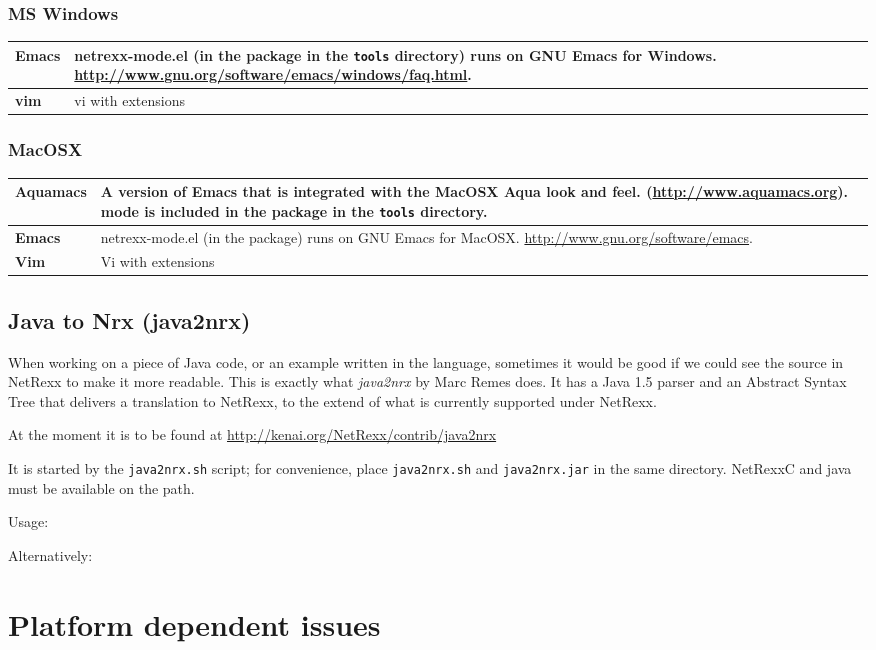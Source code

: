 {\subsection{MS Windows}
\begin{tabularx}{\textwidth}{>{\bfseries}lX}
\toprule
Emacs & netrexx-mode.el (in the \nr{} package in the \texttt{tools} directory) runs on GNU Emacs for
Windows. \url{http://www.gnu.org/software/emacs/windows/faq.html}.
\\\midrule
vim & vi with extensions
\\\bottomrule
\end{tabularx}
\subsection{MacOSX}
\begin{tabularx}{\textwidth}{>{\bfseries}lX}
\toprule
Aquamacs & A version of Emacs that is integrated with the MacOSX Aqua
look and feel. (\url{http://www.aquamacs.org}). \nr{} mode is
included in the \nr{} package in the \texttt{tools} directory.
\\\midrule
Emacs & netrexx-mode.el (in the \nr{} package) runs on GNU Emacs for
MacOSX. \url{http://www.gnu.org/software/emacs}.
\\\midrule
Vim & Vi with extensions
\\\bottomrule
\end{tabularx}
\section{Java to Nrx (java2nrx)}
When working on a piece of Java code, or an example written in the
language, sometimes it would be good if we could see the source in
NetRexx to make it more readable. This is exactly what \emph{java2nrx}
by Marc Remes does. It has a  Java 1.5 parser and an Abstract Syntax
Tree that delivers a translation to NetRexx, to the
extend of what is currently supported under NetRexx.

At the moment it is to be found at \url{http://kenai.org/NetRexx/contrib/java2nrx}

It is started by the \texttt{java2nrx.sh} script; for convenience, place \texttt{java2nrx.sh} and \texttt{java2nrx.jar} in the
same directory. NetRexxC and java must be available on the path.

Usage:

Alternatively:


\chapter{Platform dependent issues}
}

